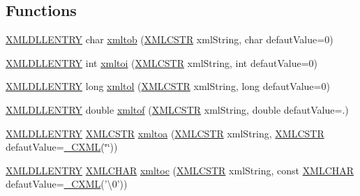 \subsection*{Functions}
\begin{DoxyCompactItemize}
\item 
\hyperlink{xmlParser_8h_a990c86ec1cdbf675604a1a321d852063}{X\-M\-L\-D\-L\-L\-E\-N\-T\-R\-Y} char \hyperlink{group__atoX_gac93e613b4563072bf7b43f91d2696c75}{xmltob} (\hyperlink{xmlParser_8h_acdb0d6fd8dd596384b438d86cfb2b182}{X\-M\-L\-C\-S\-T\-R} xml\-String, char defaut\-Value=0)
\item 
\hyperlink{xmlParser_8h_a990c86ec1cdbf675604a1a321d852063}{X\-M\-L\-D\-L\-L\-E\-N\-T\-R\-Y} int \hyperlink{group__atoX_ga17b00a11ddc49e8e253160cc56d6377f}{xmltoi} (\hyperlink{xmlParser_8h_acdb0d6fd8dd596384b438d86cfb2b182}{X\-M\-L\-C\-S\-T\-R} xml\-String, int defaut\-Value=0)
\item 
\hyperlink{xmlParser_8h_a990c86ec1cdbf675604a1a321d852063}{X\-M\-L\-D\-L\-L\-E\-N\-T\-R\-Y} long \hyperlink{group__atoX_gab69be88d6b554476470e7a1e6ec23589}{xmltol} (\hyperlink{xmlParser_8h_acdb0d6fd8dd596384b438d86cfb2b182}{X\-M\-L\-C\-S\-T\-R} xml\-String, long defaut\-Value=0)
\item 
\hyperlink{xmlParser_8h_a990c86ec1cdbf675604a1a321d852063}{X\-M\-L\-D\-L\-L\-E\-N\-T\-R\-Y} double \hyperlink{group__atoX_gaf820a1a0f8055c8e4a006a566be9500a}{xmltof} (\hyperlink{xmlParser_8h_acdb0d6fd8dd596384b438d86cfb2b182}{X\-M\-L\-C\-S\-T\-R} xml\-String, double defaut\-Value=.)
\item 
\hyperlink{xmlParser_8h_a990c86ec1cdbf675604a1a321d852063}{X\-M\-L\-D\-L\-L\-E\-N\-T\-R\-Y} \hyperlink{xmlParser_8h_acdb0d6fd8dd596384b438d86cfb2b182}{X\-M\-L\-C\-S\-T\-R} \hyperlink{group__atoX_ga20998546f61a5d41ed3fe4553702473a}{xmltoa} (\hyperlink{xmlParser_8h_acdb0d6fd8dd596384b438d86cfb2b182}{X\-M\-L\-C\-S\-T\-R} xml\-String, \hyperlink{xmlParser_8h_acdb0d6fd8dd596384b438d86cfb2b182}{X\-M\-L\-C\-S\-T\-R} defaut\-Value=\hyperlink{xmlParser_8h_a17b1f4694ce8bdeef4c07319c5f8f84d}{\-\_\-\-C\-X\-M\-L}(\char`\"{}\char`\"{}))
\item 
\hyperlink{xmlParser_8h_a990c86ec1cdbf675604a1a321d852063}{X\-M\-L\-D\-L\-L\-E\-N\-T\-R\-Y} \hyperlink{xmlParser_8h_a9f587fbd233e721e8818a3bf8102838f}{X\-M\-L\-C\-H\-A\-R} \hyperlink{group__atoX_gaa929f34f436c3466e66196e5e2091e73}{xmltoc} (\hyperlink{xmlParser_8h_acdb0d6fd8dd596384b438d86cfb2b182}{X\-M\-L\-C\-S\-T\-R} xml\-String, const \hyperlink{xmlParser_8h_a9f587fbd233e721e8818a3bf8102838f}{X\-M\-L\-C\-H\-A\-R} defaut\-Value=\hyperlink{xmlParser_8h_a17b1f4694ce8bdeef4c07319c5f8f84d}{\-\_\-\-C\-X\-M\-L}('\textbackslash{}0'))
\end{DoxyCompactItemize}


